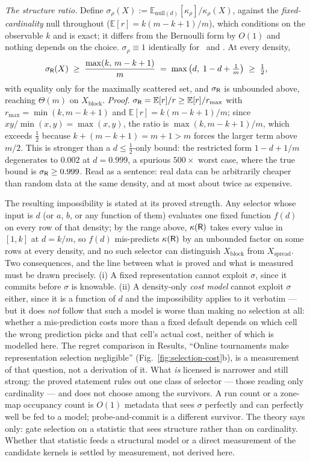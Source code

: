 \emph{The structure ratio.} Define $\sigma_\rho(X):=\mathbb{E}_{\mathrm{null}(d)}[\kappa_\rho]/\kappa_\rho(X)$,
against the \emph{fixed-cardinality} null throughout ($\mathbb{E}[r]=k(m-k+1)/m$), which conditions on
the observable $k$ and is exact; it differs from the Bernoulli form by $O(1)$ and nothing depends on
the choice. $\sigma_\rho\equiv1$ identically for \rB\ and \rS. At every density,
\begin{equation}
\sigma_{\textsf{R}}(X) \;\ge\; \frac{\max(k,\,m-k+1)}{m} \;=\; \max\big(d,\;1-d+\tfrac1m\big) \;\ge\; \tfrac12,
\label{eq:s3-p10}
\end{equation}
with equality only for the maximally scattered set, and $\sigma_{\textsf{R}}$ is unbounded above, reaching
$\Theta(m)$ on $X_{\mathrm{block}}$. \emph{Proof.}
$\sigma_{\textsf{R}}=\mathbb{E}[r]/r\ge\mathbb{E}[r]/r_{\max}$ with $r_{\max}=\min(k,m-k+1)$ and
$\mathbb{E}[r]=k(m-k+1)/m$; since $xy/\min(x,y)=\max(x,y)$, the ratio is $\max(k,m-k+1)/m$, which
exceeds $\tfrac12$ because $k+(m-k+1)=m+1>m$ forces the larger term above $m/2$. This is stronger than
a $d\le\tfrac12$-only bound: the restricted form $1-d+1/m$ degenerates to $0.002$ at $d=0.999$, a
spurious $500\times$ worst case, where the true bound is $\sigma_{\textsf{R}}\ge0.999$. Read as a sentence:
real data can be arbitrarily cheaper than random data at the same density, and at most about
twice as expensive.

The resulting impossibility is stated at its proved strength. Any selector
whose input is $d$ (or $a$, $b$, or any function of them) evaluates one fixed function $f(d)$ on every
row of that density; by the range above, $\kappa(\textsf{R})$ takes every value in $[1,k]$ at $d=k/m$, so
$f(d)$ mis-predicts $\kappa(\textsf{R})$ by an unbounded factor on some rows at every density, and no such
selector can distinguish $X_{\mathrm{block}}$ from $X_{\mathrm{spread}}$. Two consequences, and the
line between what is proved and what is measured must be drawn precisely. (i) A fixed representation
cannot exploit $\sigma$, since it commits before $\sigma$ is knowable. (ii) A density-only \emph{cost
model} cannot exploit $\sigma$ either, since it is a function of $d$ and the impossibility applies to it
verbatim --- but it does \emph{not} follow that such a model is worse than making no selection at all:
whether a mis-prediction costs more than a fixed default depends on which cell the wrong prediction
picks and that cell's actual cost, neither of which is modelled here. The regret comparison in
Results, ``Online tournaments make representation selection negligible''
(Fig.~\ref{fig:selection-cost}b), is a measurement of that question, not a derivation of it.
What \emph{is} licensed is narrower and still strong: the
proved statement rules out one class of selector --- those reading only cardinality --- and does not
choose among the survivors. A run count or a zone-map occupancy count is $O(1)$ metadata that sees
$\sigma$ perfectly and can perfectly well be fed to a model; probe-and-commit is a different survivor.
The theory says only: gate selection on a statistic that sees structure rather than on cardinality.
Whether that statistic feeds a structural model or a direct measurement of the candidate kernels is
settled by measurement, not derived here.

